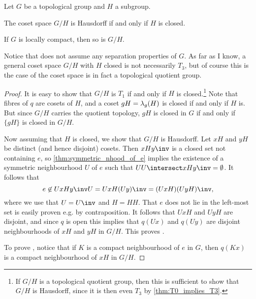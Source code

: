 \documentclass[article, a4paper, 11pt, oneside]{memoir}
\numberwithin{equation}{chapter}
\begin{document}
\begin{proposition}
    Let $G$ be a topological group and $H$ a subgroup.
    \begin{enumprop}
        \item \label{enum:coset_space_hausdorff} The coset space $G/H$ is Hausdorff if and only if $H$ is closed.
        
        \item \label{enum:coset_space_locally_compact} If $G$ is locally compact\footnotemark, then so is $G/H$.
    \end{enumprop}
\end{proposition}
%
Notice that  does not assume any separation properties of $G$. As far as I know, a general coset space $G/H$ with $H$ closed is not necessarily $T_3$, but of course this is the case of the coset space is in fact a topological quotient group.

\begin{proof}
    It is easy to show that $G/H$ is $T_1$ if and only if $H$ is closed.\footnote{If $G/H$ is a topological quotient group, then this is sufficient to show that $G/H$ is Hausdorff, since it is then even $T_3$ by \cref{thm:T0_implies_T3}.} Note that fibres of $q$ are cosets of $H$, and a coset $gH = \lambda_g(H)$ is closed if and only if $H$ is. But since $G/H$ carries the quotient topology, $gH$ is closed in $G$ if and only if $\{gH\}$ is closed in $G/H$.

    Now assuming that $H$ is closed, we show that $G/H$ is Hausdorff. Let $xH$ and $yH$ be distinct (and hence disjoint) cosets. Then $xHy\inv$ is a closed set not containing $e$, so \cref{thm:symmetric_nhood_of_e} implies the existence of a symmetric neighbourhood $U$ of $e$ such that $UU \intersect xHy\inv = \emptyset$. It follows that
    \begin{equation*}
        e
            \not\in U xHy\inv U
            = Ux H (Uy)\inv
            = (UxH)(UyH)\inv,
    \end{equation*}
    where we use that $U = U\inv$ and $H = HH$. That $e$ does not lie in the left-most set is easily proven e.g. by contraposition. It follows that $UxH$ and $UyH$ are disjoint, and since $q$ is open this implies that $q(Ux)$ and $q(Uy)$ are disjoint neighbourhoods of $xH$ and $yH$ in $G/H$. This proves .

    To prove , notice that if $K$ is a compact neighbourhood of $e$ in $G$, then $q(Kx)$ is a compact neighbourhood of $xH$ in $G/H$.
\end{proof}
\end{document}
